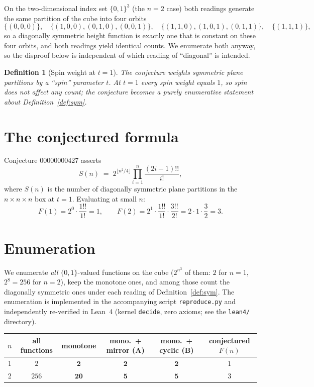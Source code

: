 \documentclass[11pt]{article}
\newtheorem{definition}{Definition}
\begin{document}
On the two-dimensional index set $\{0,1\}^3$ (the $n=2$ case) both readings
generate the same partition of the cube into four orbits
\[
\{(0,0,0)\},\quad
\{(1,0,0),(0,1,0),(0,0,1)\},\quad
\{(1,1,0),(1,0,1),(0,1,1)\},\quad
\{(1,1,1)\},
\]
so a diagonally symmetric height function is exactly one that is constant on
these four orbits, and both readings yield identical counts.  We enumerate
both anyway, so the disproof below is independent of which reading of
``diagonal'' is intended.

\begin{definition}[Spin weight at $t=1$]
The conjecture weights symmetric plane partitions by a ``spin'' parameter
$t$.  At $t=1$ every spin weight equals $1$, so spin does not affect any
count; the conjecture becomes a purely enumerative statement about
Definition~\ref{def:sym}.
\end{definition}

\section{The conjectured formula}

Conjecture 00000000427 asserts
\[
S(n)\;=\;2^{\lfloor n^2/4\rfloor}\prod_{i=1}^{n}\frac{(2i-1)!!}{i!},
\]
where $S(n)$ is the number of diagonally symmetric plane partitions in the
$n\times n\times n$ box at $t=1$.  Evaluating at small $n$:
\[
F(1)=2^{0}\cdot\frac{1!!}{1!}=1,
\qquad
F(2)=2^{1}\cdot\frac{1!!}{1!}\cdot\frac{3!!}{2!}=2\cdot1\cdot\frac{3}{2}=3 .
\]

\section{Enumeration}

We enumerate \emph{all} $\{0,1\}$-valued functions on the cube
($2^{n^3}$ of them: $2$ for $n=1$, $2^8=256$ for $n=2$), keep the monotone
ones, and among those count the diagonally symmetric ones under each reading
of Definition~\ref{def:sym}.  The enumeration is implemented in the
accompanying script \texttt{reproduce.py} and independently re-verified in
Lean~4 (kernel \texttt{decide}, zero axioms; see the \texttt{lean4/}
directory).

\begin{center}
\begin{tabular}{cccccc}
\toprule
$n$ & all functions & monotone & mono.\ + mirror (A) & mono.\ + cyclic (B) & conjectured $F(n)$\\
\midrule
1 & $2$   & $\mathbf{2}$  & $\mathbf{2}$ & $\mathbf{2}$ & $1$\\
2 & $256$ & $\mathbf{20}$ & $\mathbf{5}$ & $\mathbf{5}$ & $3$\\
\bottomrule
\end{tabular}
\end{center}
\end{document}
